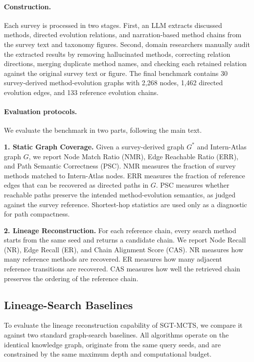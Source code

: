 \documentclass{llmxive}
\begin{document}
\paragraph{Construction.}
Each survey is processed in two stages. First, an LLM extracts discussed methods, directed evolution relations, and narration-based method chains from the
survey text and taxonomy figures. Second, domain researchers manually audit the extracted results by removing hallucinated methods, correcting relation
directions, merging duplicate method names, and checking each retained relation against the original survey text or figure. The final benchmark contains 30
survey-derived method-evolution graphs with 2,268 nodes, 1,462 directed evolution edges, and 133 reference evolution chains.

\paragraph{Evaluation protocols.}
We evaluate the benchmark in two parts, following the main text.

\textbf{1. Static Graph Coverage.}
Given a survey-derived graph $G^\ast$ and Intern-Atlas graph $G$, we report Node Match Ratio (NMR), Edge Reachable Ratio (ERR), and Path Semantic
Correctness (PSC). NMR measures the fraction of survey methods matched to Intern-Atlas nodes. ERR measures the fraction of reference edges that can be
recovered as directed paths in $G$. PSC measures whether reachable paths preserve the intended method-evolution semantics, as judged against the survey
reference. Shortest-hop statistics are used only as a diagnostic for path compactness.

\textbf{2. Lineage Reconstruction.}
For each reference chain, every search method starts from the same seed and returns a candidate chain. We report Node Recall (NR), Edge Recall (ER), and
Chain Alignment Score (CAS). NR measures how many reference methods are recovered. ER measures how many adjacent reference transitions are recovered. CAS
measures how well the retrieved chain preserves the ordering of the reference chain.

\subsection{Lineage-Search Baselines}
\label{app:search-baselines}

To evaluate the lineage reconstruction capability of SGT-MCTS, we compare it against two standard graph-search baselines. All algorithms operate on the identical knowledge graph, originate from the same query seeds, and are constrained by the same maximum depth and computational budget. 
\end{document}
